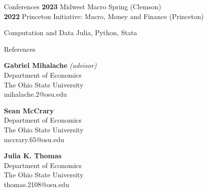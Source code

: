 \documentclass{cv} %
\begin{document}
\begin{rSection}{Conferences}
{\bf 2023} Midwest Macro Spring (Clemson) \\
{\bf 2022} Princeton Initiative: Macro, Money and Finance (Princeton)
\end{rSection}
\bigskip


\begin{rSection}{Computation and Data}
Julia, Python, Stata
\end{rSection}
\bigskip

\begin{rSection}{References} 
\begin{minipage}{6cm}
	{\bf Gabriel Mihalache} \emph{(advisor)} \\
	Department of Economics \\
	The Ohio State University \\
	mihalache.2@osu.edu
\end{minipage}
\begin{minipage}{6cm}
	{\bf Sean McCrary} \\
	Department of Economics \\
	The Ohio State University \\
	mccrary.65@osu.edu
\end{minipage}
\begin{minipage}{6cm}
	{\bf Julia K. Thomas} \\
	Department of Economics \\
	The Ohio State University \\
	thomas.2108@osu.edu
\end{minipage}

\end{rSection}
\end{document}
